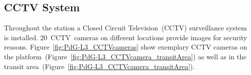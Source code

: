\subsection{CCTV System}
\label{subsec:CCTVSystem}

Throughout the station a Closed Circuit Television~(CCTV) surveillance system is installed. 20~CCTV~cameras on different locations provide images for security reasons. Figure~\ref{fig:PdG-L3_CCTVcameras} show exemplary CCTV cameras on the platform~(Figure~\ref{fig:PdG-L3_CCTVcamera_transitArea}) as well as in the transit area~(Figure~\ref{fig:PdG-L3_CCTVcamera_transitArea}).


